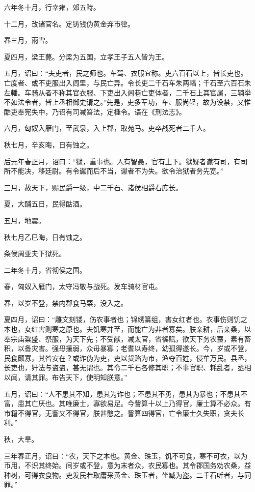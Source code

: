\documentclass[]{article}
\begin{document}
六年冬十月，行幸雍，郊五畤。

十二月，改诸官名。定铸钱伪黄金弃市律。

春三月，雨雪。

夏四月，梁王薨。分梁为五国，立孝王子五人皆为王。

五月，诏曰：``夫吏者，民之师也。车驾、衣服宜称。吏六百石以上，皆长吏也。亡度者、或不吏服出入闾里，与民亡异。令长吏二千石车朱两轓；千石至六百石朱左轓。车骑从者不称其官衣服、下吏出入闾巷亡吏体者，二千石上其官属，三辅举不如法令者，皆上丞相御史请之。''先是，吏多军功，车、服尚轻，故为设禁，又惟酷吏奉宪失中，乃诏有司减笞法，定棰令。语在《刑法志》。

六月，匈奴入雁门，至武泉，入上郡，取苑马。吏卒战死者二千人。

秋七月，辛亥晦，日有蚀之。

后元年春正月，诏曰：``狱，重事也。人有智愚，官有上下。狱疑者谳有司，有司所不能决，移廷尉。有令谳而后不当，谳者不为失。欲令治狱者务先宽。''

三月，赦天下，赐民爵一级，中二千石、诸侯相爵右庶长。

夏，大酺五日，民得酤酒。

五月，地震。

秋七月乙巳晦，日有蚀之。

条侯周亚夫下狱死。

二年冬十月，省彻侯之国。

春，匈奴入雁门，太守冯敬与战死。发车骑材官屯。

春，以岁不登，禁内郡食马粟，没入之。

夏四月，诏曰：``雕文刻镂，伤农事者也；锦绣纂组，害女红者也。农事伤则饥之本也，女红害则寒之原也。夫饥寒并至，而能亡为非者寡矣。朕亲耕，后亲桑，以奉宗庙粢盛、祭服，为天下先；不受献，减太官，省徭赋，欲天下务农蚕，素有畜积，以备灾害。强毋攘弱，众毋暴寡；老耆以寿终，幼孤得遂长。今，岁或不登，民食颇寡，其咎安在？或诈伪为吏，吏以货赂为市，渔夺百姓，侵牟万民。县丞，长吏也，奸法与盗盗，甚无谓也。其令二千石各修其职；不事官职、耗乱者，丞相以闻，请其罪。布告天下，使明知朕意。''

五月，诏曰：``人不患其不知，患其为诈也；不患其不勇，患其为暴也；不患其不富，患其亡厌也。其唯廉士，寡欲易足。今訾算十以上乃得官，廉士算不必众。有市籍不得官，无訾又不得官，朕甚愍之。訾算四得官，亡令廉士久失职，贪夫长利。''

秋，大旱。

三年春正月，诏曰：``农，天下之本也。黄金、珠玉，饥不可食，寒不可衣，以为币用，不识其终始。间岁或不登，意为末者众，农民寡也。其令郡国务劝农桑，益种树，可得衣食物。吏发民若取庸采黄金、珠玉者，坐臧为盗。二千石听者，与同罪。''
\end{document}
